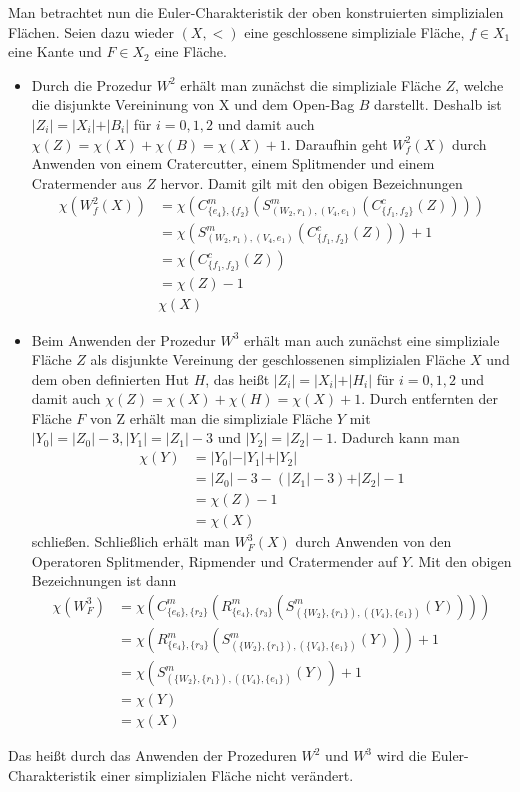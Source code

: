 \documentclass[12pt,titlepage]{article}
\begin{document}
Man betrachtet nun die Euler-Charakteristik der oben konstruierten simplizialen Flächen. Seien dazu wieder $(X,<)$ eine geschlossene simpliziale Fläche, $f\in X_1$ eine Kante und $F\in X_2$ eine Fläche.
\begin{itemize}
\item Durch die Prozedur $W^2$ erhält man zunächst die simpliziale Fläche $Z$, welche die disjunkte Vereininung von X und dem Open-Bag $B$ darstellt. Deshalb ist $\vert Z_i\vert= \vert X_i \vert+\vert B_i\vert$ für $i=0,1,2$ und damit auch $\chi(Z)=\chi(X)+\chi(B)=\chi(X)+1.$ Daraufhin geht $W^2_f(X)$ durch Anwenden von einem Cratercutter, einem Splitmender und einem Cratermender aus $Z$ hervor. Damit gilt mit den obigen Bezeichnungen 
\begin{align*}
\chi(W^2_f(X))&=\chi(C_{\{e_4\},\{f_2\}}^m(S^m_{(W_2,r_1),(V_4,e_1)}(C_{\{f_1,f_2\}}^c(Z))))\\
&=\chi(S^m_{(W_2,r_1),(V_4,e_1)}(C_{\{f_1,f_2\}}^c(Z)))+1\\
&=\chi(C_{\{f_1,f_2\}}^c(Z))\\
&=\chi(Z)-1\\
&\chi(X)
\end{align*}

\item Beim Anwenden der Prozedur $W^3$ erhält man auch zunächst eine simpliziale Fläche $Z$ als disjunkte Vereinung der geschlossenen simplizialen Fläche $X$ und dem oben definierten Hut $H$, das heißt $\vert Z_i\vert= \vert X_i \vert+\vert H_i\vert$ für $i=0,1,2$ und damit auch $\chi(Z)=\chi(X)+\chi(H)=\chi(X)+1.$ Durch entfernten der Fläche $F$ von Z erhält man die simpliziale Fläche $Y$ mit $\vert Y_0\vert= \vert Z_0 \vert-3,\vert Y_1\vert= \vert Z_1 \vert-3$ und $\vert Y_2\vert= \vert Z_2 \vert-1$. Dadurch kann man 
\begin{align*}
\chi(Y)&=\vert Y_0 \vert-\vert Y_1 \vert+\vert Y_2 \vert\\
&=\vert Z_0 \vert-3-(\vert Z_1 \vert-3)+\vert Z_2 \vert-1\\
&=\chi(Z)-1\\
&=\chi(X)
\end{align*}
schließen. Schließlich erhält man $W^3_F(X)$ durch Anwenden von den Operatoren Splitmender, Ripmender und Cratermender auf $Y$. Mit den obigen Bezeichnungen ist dann 
\begin{align*}
\chi(W_F^3)&=\chi(C^m_{\{e_6\},\{r_2\}}(R^m_{\{e_4\},\{r_3\}}(S^m_{(\{W_2\},\{r_1\}),(\{V_4\},\{e_1\})}(Y))))\\
&=\chi(R^m_{\{e_4\},\{r_3\}}(S^m_{(\{W_2\},\{r_1\}),(\{V_4\},\{e_1\})}(Y)))+1\\
&=\chi(S^m_{(\{W_2\},\{r_1\}),(\{V_4\},\{e_1\})}(Y))+1\\
&=\chi(Y)\\
&=\chi(X)
\end{align*}
\end{itemize}
Das heißt durch das Anwenden der Prozeduren $W^2$ und $W^3$ wird die Euler-Charakteristik einer simplizialen Fläche nicht verändert.
\end{document}
